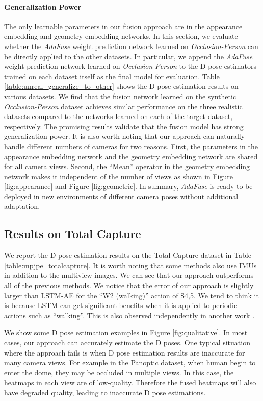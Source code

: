 \paragraph{Generalization Power}
The only learnable parameters in our fusion approach are in the appearance embedding and geometry embedding networks. In this section, we evaluate whether the {\emph{AdaFuse} weight prediction network} learned on \emph{Occlusion-Person} can be directly applied to the other datasets. {In particular, we append the \emph{AdaFuse} weight prediction network learned on \emph{Occlusion-Person} to the D pose estimators trained on each dataset itself as the final model for evaluation}. Table \ref{table:unreal_generalize_to_other} shows the D pose estimation results on various datasets. We find that the fusion network learned on the synthetic \emph{Occlusion-Person} dataset achieves 
{similar} performance on the three realistic datasets compared to the networks learned on each of the target dataset, respectively. The promising results validate that the fusion model has strong generalization power. It is also worth noting that our approach can naturally handle different numbers of cameras for two reasons. First, the parameters in the appearance embedding network and the geometry embedding network are shared for all camera views. Second, the ``Mean'' operator in the geometry embedding network makes it independent of the number of views as shown in Figure \ref{fig:appearance} and Figure \ref{fig:geometric}. In summary, \emph{AdaFuse} is ready to be deployed in new environments of different camera poses without additional adaptation.




\subsection{Results on Total Capture}
We report the D pose estimation results on the Total Capture dataset in Table \ref{table:mpjpe_totalcapture}. It is worth noting that some methods also use IMUs in addition to the multiview images. We can see that our approach outperforms all of the previous methods. We notice that the error of our approach is slightly larger than LSTM-AE \citep{trumble2018deep} for the ``W2 (walking)'' action of S4,5. We tend to think it is because LSTM can get significant benefits when it is applied to periodic actions such as ``walking''. This is also observed independently in another work \citep{gilbert2019fusing}.

We show some D pose estimation examples in Figure \ref{fig:qualitative}. In most cases, our approach can accurately estimate the D poses. One typical situation where the approach fails is when D pose estimation results are inaccurate for many camera views. For example in the Panoptic dataset, when human begin to enter the dome, they may be occluded in multiple views. In this case, the heatmaps in each view are of low-quality. Therefore the fused heatmaps will also have degraded quality, leading to inaccurate D pose estimations.




